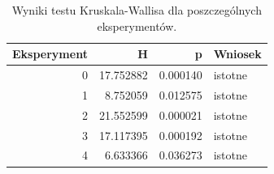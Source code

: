 \begin{table}
\caption{Wyniki testu Kruskala-Wallisa dla poszczególnych eksperymentów.}
\label{tab:kruskal_exp}
\begin{tabular}{rrrl}
\toprule
Eksperyment & H & p & Wniosek \\
\midrule
0 & 17.752882 & 0.000140 & istotne \\
1 & 8.752059 & 0.012575 & istotne \\
2 & 21.552599 & 0.000021 & istotne \\
3 & 17.117395 & 0.000192 & istotne \\
4 & 6.633366 & 0.036273 & istotne \\
\bottomrule
\end{tabular}
\end{table}
